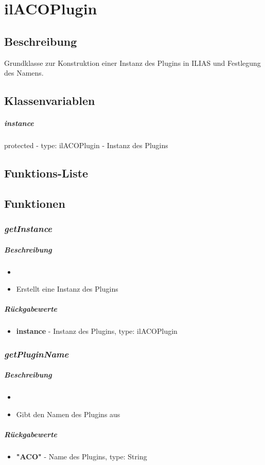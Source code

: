 \section{ilACOPlugin}

\subsection*{Beschreibung}
Grundklasse zur Konstruktion einer Instanz des Plugins in ILIAS und Festlegung des Namens.

\subsection*{Klassenvariablen}
\subparagraph{instance}
protected - type: ilACOPlugin - Instanz des Plugins

\subsection*{Funktions-Liste}
\paragraph{}
\paragraph{}

\subsection*{Funktionen}
\subsubsection*{\textit{getInstance}}\label{getInstanceUIHGUI}
\subparagraph{Beschreibung}
\begin{itemize}
	\item[] \noindent{} 
	\item[] Erstellt eine Instanz des Plugins
\end{itemize}
\subparagraph{Rückgabewerte}
\begin{itemize}
	\item[] \textbf{instance} - Instanz des Plugins, type: ilACOPlugin
\end{itemize}

\subsubsection*{\textit{getPluginName}}\label{getPluginNameUIHGUI}
\subparagraph{Beschreibung}
\begin{itemize}
	\item[] \noindent{} 
	\item[] Gibt den Namen des Plugins aus
\end{itemize}
\subparagraph{Rückgabewerte}
\begin{itemize}
	\item[] \textbf{"ACO"} - Name des Plugins, type: String
\end{itemize}